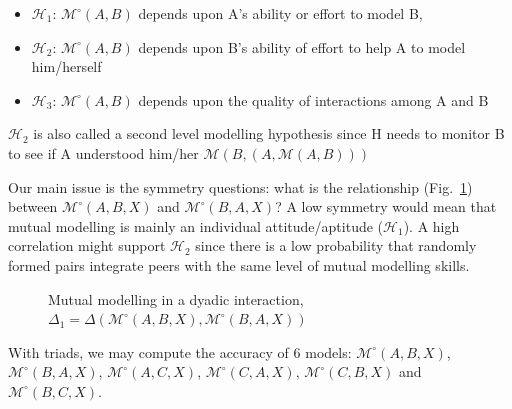 \documentclass[twocolumn]{article}
\newcommand{\Model}[3]{{$\mathcal{M}^{\circ}(#1, #2, #3)$}}
\begin{document}
\begin{itemize}
    \item $\mathcal{H}_{1}$: $\mathcal{M}^{\circ}(A,B)$ depends upon A's ability or effort
        to model B,
    
    \item $\mathcal{H}_{2}$: $\mathcal{M}^{\circ}(A,B)$ depends upon  B's ability of
        effort to help A to model him/herself 

    \item $\mathcal{H}_{3}$: $\mathcal{M}^{\circ}(A,B)$ depends upon the quality of
        interactions among A and B

\end{itemize}



$\mathcal{H}_{2}$ is also called a second level modelling hypothesis since H
needs to monitor B to see if A understood him/her
$\mathcal{M}(B,(A,\mathcal{M}(A,B)))$

Our main issue is the symmetry questions: what is the relationship
(Fig.~\ref{mm_symmetry}) between \Model{A}{B}{X} and \Model{B}{A}{X}? A low
symmetry would mean that mutual modelling is mainly an individual
attitude/aptitude ($\mathcal{H}_{1}$). A high correlation might support
$\mathcal{H}_{2}$ since there is a low probability that randomly formed pairs
integrate peers with the same level of mutual modelling skills.

\begin{figure}[htb]
\centering


\caption{\small Mutual modelling in a dyadic interaction, $\Delta_1 =
    \Delta(\mathcal{M}^{\circ} (A,B,X),
\mathcal{M}^{\circ} (B,A,X))$}

\label{mm_symmetry}
\end{figure}


With triads, we may compute the accuracy of 6 models:
\Model{A}{B}{X}, \Model{B}{A}{X}, \Model{A}{C}{X}, \Model{C}{A}{X},
\Model{C}{B}{X} and \Model{B}{C}{X}.
\end{document}
